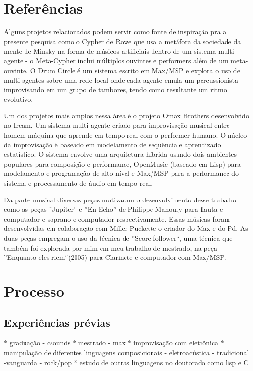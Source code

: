\documentclass{ppgmus}
\begin{document}
\section{Referências}

Alguns projetos relacionados podem servir como fonte de inspiração pra
a presente pesquisa como o Cypher \cite{rowe93:interactive}   de Rowe que usa a metáfora da
sociedade da mente de Minsky na forma de músicos artificiais dentro de
um sistema multi-agente - o Meta-Cypher inclui múltiplos ouvintes e
performers além de um meta-ouvinte.  O Drum Circle \cite{eigenfeld07:drum} é um sistema escrito em Max/MSP e explora o uso de
multi-agentes sobre uma rede local onde cada agente emula um
percussionista improvisando em um grupo de tambores, tendo como
resultante um ritmo evolutivo.

Um dos projetos mais amplos nessa área é o projeto Omax Brothers \cite{assayag06:omax}
desenvolvido no Ircam. Um sistema multi-agente criado para
improvisação musical entre homem-máquina que aprende em tempo-real com
o performer humano. O núcleo da improvisação é baseado em modelamento
de sequência e aprendizado estatístico. O sistema envolve uma
arquitetura híbrida usando dois ambientes populares para composição e
performance, OpenMusic (baseado em Lisp) para modelamento e
programação de alto nível e Max/MSP para a performance do sistema e
processamento de áudio em tempo-real.

Da parte musical diversas peças motivaram o desenvolvimento desse trabalho como as peças
''Jupiter'' e ''En Echo'' de Philippe Manoury para flauta e computador e soprano e computador respectivamente.
Essas músicas foram desenvolvidas em colaboração com Miller Puckette o criador do Max e do Pd. As duas 
peças empregam o uso da técnica de ''Score-follower``, uma técnica que também foi explorada por mim em
meu trabalho de mestrado, na peça ''Enquanto eles riem``(2005) para Clarinete e computador com Max/MSP.

\section{Processo}


\subsection{Experiências prévias}

* graduação - csounds
* mestrado - max
* improvisação com eletrônica
* manipulação de diferentes linguagens composicionais - eletroacústica - tradicional -vanguarda - rock/pop
* estudo de outras linguagens no doutorado como lisp e C
\end{document}

